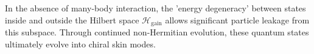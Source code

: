 \documentclass[longbibliography, aps, prx, amsmath, amssymb, amsfonts, twocolumn,superscriptaddress, footinbib]{revtex4-1}
\begin{document}
	In the absence of many-body interaction, the 'energy degeneracy' between states inside and outside the Hilbert space $\mathscr{H}_{\text{gain}}$ allows significant particle leakage from this subspace.
	Through continued non-Hermitian evolution, these quantum states ultimately evolve into chiral skin modes.

\end{document}
